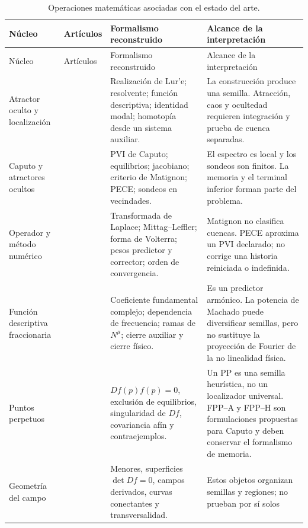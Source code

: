 \begin{longtable}{@{}L{0.16\textwidth}L{0.22\textwidth}L{0.28\textwidth}L{0.26\textwidth}@{}}
\caption{Operaciones matemáticas asociadas con el estado del arte.}
\label{tab:articulos-operaciones}\\
\toprule
Núcleo & Artículos & Formalismo reconstruido & Alcance de la interpretación \\
\midrule
\endfirsthead
\toprule
Núcleo & Artículos & Formalismo reconstruido & Alcance de la interpretación \\
\midrule
\endhead
Atractor oculto y localización
& \cite{LeonovKuznetsovVagaitsev2011,LeonovKuznetsov2013,KuznetsovEtAl2017}
& Realización de Lur'e; resolvente; función descriptiva; identidad modal;
homotopía desde un sistema auxiliar.
& La construcción produce una semilla. Atracción, caos y ocultedad requieren
integración y prueba de cuenca separadas. \\
Caputo y atractores ocultos
& \cite{Danca2017}
& PVI de Caputo; equilibrios; jacobiano; criterio de Matignon; PECE; sondeos en
vecindades.
& El espectro es local y los sondeos son finitos. La memoria y el terminal
inferior forman parte del problema. \\
Operador y método numérico
& \cite{Matignon1996,DiethelmFordFreed2002}
& Transformada de Laplace; Mittag--Leffler; forma de Volterra; pesos predictor
y corrector; orden de convergencia.
& Matignon no clasifica cuencas. PECE aproxima un PVI declarado; no corrige una
historia reiniciada o indefinida. \\
Función descriptiva fraccionaria
& \cite{BarbosaMachado2002BacklashImpact,Machado2015FDF}
& Coeficiente fundamental complejo; dependencia de frecuencia; ramas de
\(N^\mu\); cierre auxiliar y cierre físico.
& Es un predictor armónico. La potencia de Machado puede diversificar semillas,
pero no sustituye la proyección de Fourier de la no linealidad física. \\
Puntos perpetuos
& \cite{Prasad2015Perpetual,DudkowskiPrasadKapitaniak2017,NazarimehrSaediJafari2017}
& \(Df(p)f(p)=0\), exclusión de equilibrios, singularidad de \(Df\),
covariancia afín y contraejemplos.
& Un PP es una semilla heurística, no un localizador universal. FPP--A y FPP--H
son formulaciones propuestas para Caputo y deben conservar el formalismo de
memoria. \\
Geometría del campo
& \cite{GuanXie2021Connecting,GodaraEtAl2018CriticalSurfaces}
& Menores, superficies \(\det Df=0\), campos derivados, curvas conectantes y
transversalidad.
& Estos objetos organizan semillas y regiones; no prueban por sí solos

\end{longtable}
